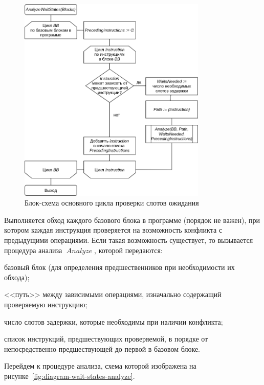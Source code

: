 \documentclass[a4paper,14pt]{extarticle}
\newcommand{\var}[1]{\mathop{\mathit{#1}}}
\begin{document}
{\begin{figure}[H]
\centering
\includegraphics[width=0.8\textwidth]{diagrams/alg-wait-states}
\caption{Блок-схема основного цикла проверки слотов ожидания}
\label{fig:diagram-wait-states}
\end{figure}

Выполняется обход каждого базового блока в программе (порядок не важен),
при котором каждая инструкция проверяется на возможность конфликта
с предыдущими операциями. Если такая возможность существует,
то вызывается процедура анализа $\var{Analyze}$, которой передаются:
\begin{ul}
\item базовый блок (для определения предшественников при необходимости их обхода);
\item <<путь>> между зависимыми операциями, изначально содержащий проверяемую инструкцию;
\item число слотов задержки, которые необходимы при наличии конфликта;
\item список инструкций, предшествующих проверяемой, в порядке
от непосредственно предшествующей до первой в базовом блоке.
\end{ul}

Перейдем к процедуре анализа, схема которой изображена
на рисунке~\ref{fig:diagram-wait-states-analyze}.

}
\end{document}
